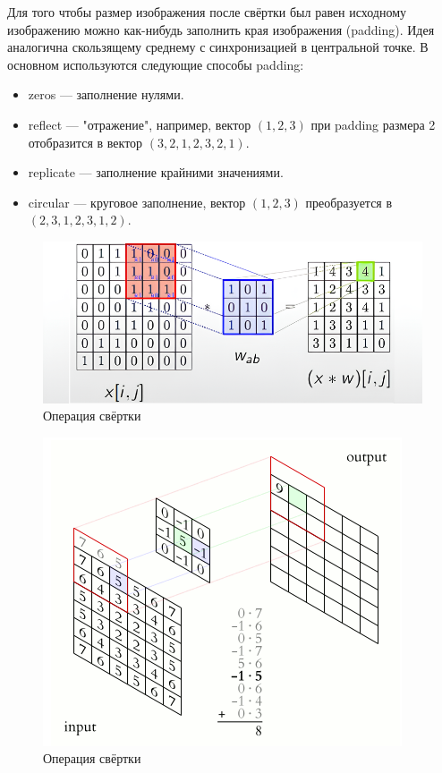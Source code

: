\documentclass{article}
\theoremstyle{definition}
\theoremstyle{theorem}
\theoremstyle{remark}
\theoremstyle{theorem}
\theoremstyle{example}
\theoremstyle{theorem}
\theoremstyle{theorem}
\theoremstyle{theorem}
\theoremstyle{theorem}
\begin{document}
	Для того чтобы размер изображения после свёртки был равен исходному изображению можно как-нибудь заполнить края изображения (padding). Идея аналогична скользящему среднему с синхронизацией в центральной точке. 
	 В основном используются следующие способы padding:
	 \begin{itemize}
	 	\item zeros --- заполнение нулями.
	 	\item reflect --- "отражение", например, вектор $(1,2,3)$ при padding размера 2 отобразится в вектор $(3,2,1,2,3,2,1)$.
	 	\item replicate --- заполнение крайними значениями.
	 	\item circular --- круговое заполнение, вектор $(1,2,3)$ преобразуется в $(2,3,1,2,3,1,2)$.
	 \end{itemize}
	 \begin{figure}[h!]
	 	\includegraphics[width=\textwidth]{cnn.png}\caption{Операция свёртки}
	 \end{figure}
	 \newpage
	 \begin{figure}[h!]
	 	\includegraphics[width=\textwidth]{pollingexample.png}\caption{Операция свёртки}
	 \end{figure}
\end{document}
